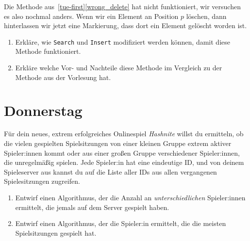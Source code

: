\documentclass{uebung_cs}
\begin{document}
\begin{aufgabe}
	Die Methode aus~\ref{tue-first}\ref{wrong_delete} hat nicht funktioniert, wir versuchen es also nochmal anders.
	Wenn wir ein Element an Position $p$ löschen, dann hinterlassen wir jetzt eine Markierung, dass dort ein Element gelöscht worden ist.
	\begin{enumerate}
		\item Erkläre, wie \texttt{Search} und \texttt{Insert} modifiziert werden können, damit diese Methode funktioniert.
		\item Erkläre welche Vor- und Nachteile diese Methode im Vergleich zu der Methode aus der Vorlesung hat.
	\end{enumerate}
\end{aufgabe}

\section*{Donnerstag}
\begin{aufgabe}[Spielserverstatistiken]
	Für dein neues, extrem erfolgreiches Onlinespiel \emph{Hashnite} willst du ermitteln, ob die vielen gespielten Spielsitzungen von einer kleinen Gruppe extrem aktiver Spieler:innen kommt oder aus einer großen Gruppe verschiedener Spieler:innen, die unregelmäßig spielen.
	Jede Spieler:in hat eine eindeutige ID, und von deinem Spieleserver aus kannst du auf die Liste aller IDs aus allen vergangenen Spielesitzungen zugreifen.
	\begin{enumerate}
		\item Entwirf einen Algorithmus, der die Anzahl an \emph{unterschiedlichen} Spieler:innen ermittelt, die jemals auf dem Server gespielt haben.
		\item Entwirf einen Algorithmus, der die Spieler:in ermittelt, die die meisten Spielsitzungen gespielt hat.
	\end{enumerate}
\end{aufgabe}
\end{document}
